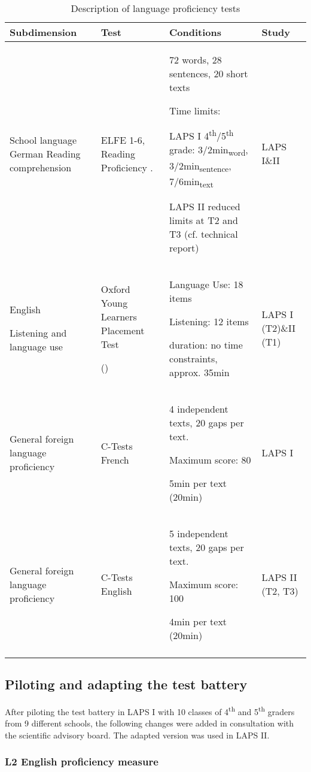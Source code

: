 \documentclass[output=paper]{langsci/langscibook}
\begin{document}
\begin{table}\footnotesize
\begin{tabularx}{\textwidth}{QQQl}
\lsptoprule
{Subdimension} & {Test} & {Conditions} & {Study}\\\midrule
School language German Reading comprehension & ELFE 1-6, Reading Proficiency \citep{LenhardSchneider2006}. & 72 words, 28 sentences, 20 short texts

Time limits:

LAPS I 4\textsuperscript{th}/5\textsuperscript{th} grade: 3/2min\textsubscript{word}, 3/2min\textsubscript{sentence}, 7/6min\textsubscript{text}

LAPS II reduced limits at T2 and T3 (cf. technical report) & LAPS I\&II\\
English 

Listening and language use & Oxford Young Learners Placement Test

(\citealt{Testing2013}) & Language Use: 18 items

Listening: 12 items

duration: no time constraints, approx. 35min & LAPS I (T2)\&II (T1)\\
General foreign language proficiency & C-Tests French & 4 independent texts, 20 gaps per text.

Maximum score: 80

5min per text (20min) & LAPS I\\
General foreign language proficiency & C-Tests English & 5 independent texts, 20 gaps per text.

Maximum score: 100

4min per text (20min) & LAPS II (T2, T3)\\
\lspbottomrule
\end{tabularx}
\caption{Description of language proficiency tests\label{tab:tests:part-4}}
\end{table}

\subsection{Piloting and adapting the test battery}\label{sec:02:3.6}

After piloting the test battery in LAPS I with 10 classes of 4\textsuperscript{th} and 5\textsuperscript{th} graders from 9 different schools, the following changes were added in consultation with the scientific advisory board. The adapted version was used in LAPS II.

\subsubsection{L2 English proficiency measure}
\end{document}
